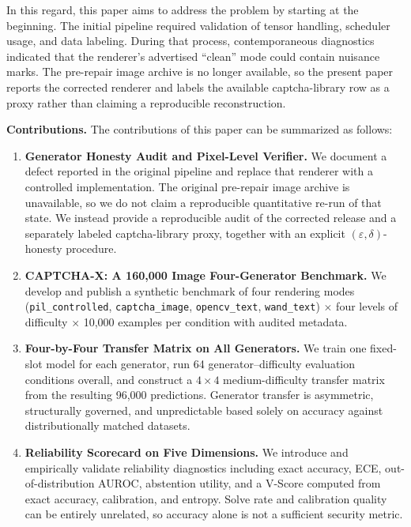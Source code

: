 \documentclass[pdflatex,sn-mathphys-num,iicol]{sn-jnl}
\begin{document}
In this regard, this paper aims to address the problem by starting at the beginning. The initial pipeline required validation of tensor handling, scheduler usage, and data labeling. During that process, contemporaneous diagnostics indicated that the renderer's advertised ``clean'' mode could contain nuisance marks. The pre-repair image archive is no longer available, so the present paper reports the corrected renderer and labels the available captcha-library row as a proxy rather than claiming a reproducible reconstruction.

\textbf{Contributions.} The contributions of this paper can be summarized as follows:

\begin{enumerate}
    \item \textbf{Generator Honesty Audit and Pixel-Level Verifier.}
    We document a defect reported in the original pipeline and replace that
    renderer with a controlled implementation. The original pre-repair image
    archive is unavailable, so we do not claim a reproducible quantitative
    re-run of that state. We instead provide a reproducible audit of the
    corrected release and a separately labeled captcha-library proxy, together
    with an explicit $(\varepsilon,\delta)$-honesty procedure.

    \item \textbf{CAPTCHA-X: A 160,000 Image Four-Generator Benchmark.}
    We develop and publish a synthetic benchmark of four rendering modes 
    (\texttt{pil\_controlled}, \texttt{captcha\_image},
    \texttt{opencv\_text}, \texttt{wand\_text}) $\times$ four levels of
    difficulty $\times$ 10,000 examples per condition with audited metadata.

\item \textbf{Four-by-Four Transfer Matrix on All Generators.}
    We train one fixed-slot model for each generator, run 64
    generator--difficulty evaluation conditions overall, and construct a
    $4 \times 4$ medium-difficulty transfer matrix from the resulting
    96,000 predictions. Generator transfer is asymmetric, structurally governed,
    and unpredictable based solely on accuracy against distributionally
    matched datasets.

    \item \textbf{Reliability Scorecard on Five Dimensions.}
    We introduce and empirically validate reliability diagnostics including
    exact accuracy, ECE, out-of-distribution AUROC, abstention utility, and
    a V-Score computed from exact accuracy, calibration, and entropy. Solve
    rate and calibration quality can be entirely unrelated, so accuracy alone
    is not a sufficient security metric.
\end{enumerate}
\end{document}
